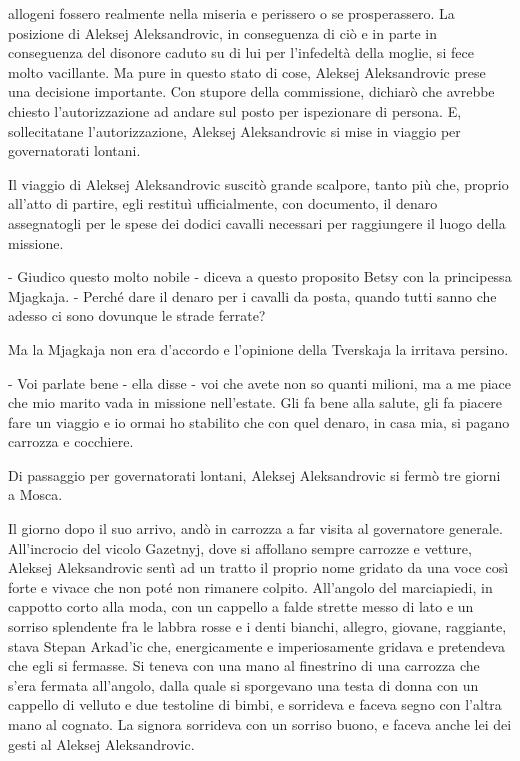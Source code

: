 allogeni fossero realmente nella miseria e perissero o se prosperassero. La posizione di Aleksej Aleksandrovic, in conseguenza di ciò e in parte in conseguenza del disonore caduto su di lui per l'infedeltà della moglie, si fece molto vacillante. Ma pure in questo stato di cose, Aleksej Aleksandrovic prese una decisione importante. Con stupore della commissione, dichiarò che avrebbe chiesto l'autorizzazione ad andare sul posto per ispezionare di persona. E, sollecitatane l'autorizzazione, Aleksej Aleksandrovic si mise in viaggio per governatorati lontani. 

Il viaggio di Aleksej Aleksandrovic suscitò grande scalpore, tanto più che, proprio all'atto di partire, egli restituì ufficialmente, con documento, il denaro assegnatogli per le spese dei dodici cavalli necessari per raggiungere il luogo della missione. 

- Giudico questo molto nobile - diceva a questo proposito Betsy con la principessa Mjagkaja. - Perché dare il denaro per i cavalli da posta, quando tutti sanno che adesso ci sono dovunque le strade ferrate? 

Ma la Mjagkaja non era d'accordo e l'opinione della Tverskaja la irritava persino. 

- Voi parlate bene - ella disse - voi che avete non so quanti milioni, ma a me piace che mio marito vada in missione nell'estate. Gli fa bene alla salute, gli fa piacere fare un viaggio e io ormai ho stabilito che con quel denaro, in casa mia, si pagano carrozza e cocchiere. 

Di passaggio per governatorati lontani, Aleksej Aleksandrovic si fermò tre giorni a Mosca. 

Il giorno dopo il suo arrivo, andò in carrozza a far visita al governatore generale. All'incrocio del vicolo Gazetnyj, dove si affollano sempre carrozze e vetture, Aleksej Aleksandrovic sentì ad un tratto il proprio nome gridato da una voce così forte e vivace che non poté non rimanere colpito. All'angolo del marciapiedi, in cappotto corto alla moda, con un cappello a falde strette messo di lato e un sorriso splendente fra le labbra rosse e i denti bianchi, allegro, giovane, raggiante, stava Stepan Arkad'ic che, energicamente e imperiosamente gridava e pretendeva che egli si fermasse. Si teneva con una mano al finestrino di una carrozza che s'era fermata all'angolo, dalla quale si sporgevano una testa di donna con un cappello di velluto e due testoline di bimbi, e sorrideva e faceva segno con l'altra mano al cognato. La signora sorrideva con un sorriso buono, e faceva anche lei dei gesti al Aleksej Aleksandrovic. 


